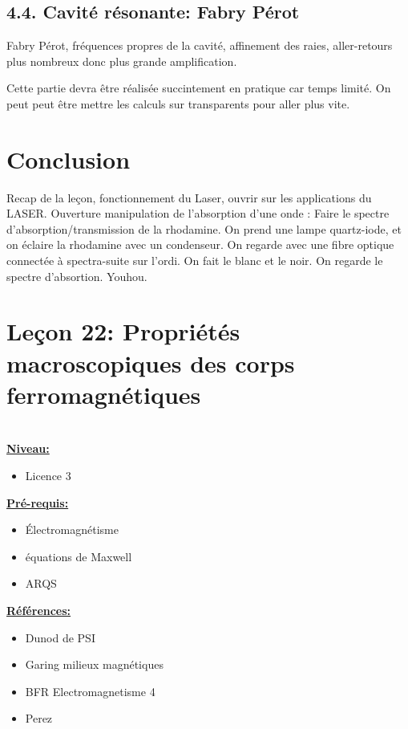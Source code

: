\documentclass[french, a4paper, 10pt, twocolumn, landscape]{article}
\begin{document}
\subsection*{4.4. Cavité résonante: Fabry Pérot}

Fabry Pérot, fréquences propres de la cavité, affinement des raies, aller-retours plus nombreux donc plus grande amplification.

Cette partie devra être réalisée succintement en pratique car temps limité. On peut peut être mettre les calculs sur transparents pour aller plus vite. 

\section*{Conclusion}

Recap de la leçon, fonctionnement du Laser, ouvrir sur les applications du LASER. Ouverture manipulation de l'absorption d'une onde : Faire le spectre d'absorption/transmission de la rhodamine. On prend une lampe quartz-iode, et on éclaire la rhodamine avec un condenseur. On regarde avec une fibre optique connectée à spectra-suite sur l'ordi. On fait le blanc et le noir. On regarde le spectre d'absortion. Youhou.

\clearpage

\section*{Leçon 22: Propriétés macroscopiques des corps ferromagnétiques}

\hrulefill\\

\noindent\underline{\textbf{Niveau:}} 
\begin{itemize}
    \item Licence 3
\end{itemize}

\noindent\underline{\textbf{Pré-requis:}}
\begin{itemize}
    \item Électromagnétisme
    \item équations de Maxwell
    \item ARQS
\end{itemize}

\noindent\underline{\textbf{Références:}}

\begin{itemize}
\item Dunod de PSI
\item Garing milieux magnétiques
\item BFR Electromagnetisme 4
\item Perez 
\end{itemize}
\end{document}
